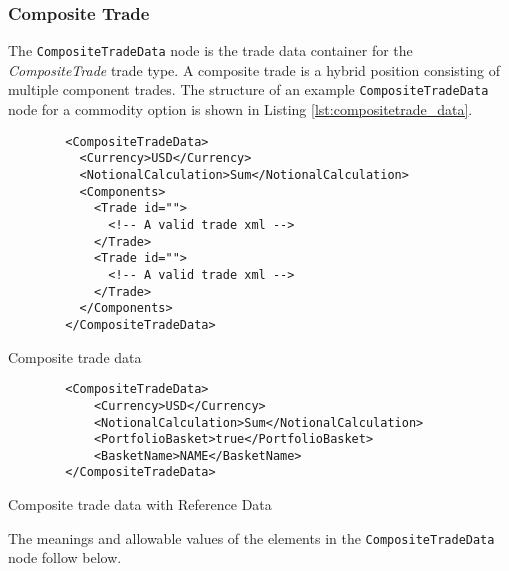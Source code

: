 \subsubsection{Composite Trade}

The \lstinline!CompositeTradeData!  node is the trade data container for the  \emph{CompositeTrade} trade type.   A composite trade is a hybrid position consisting of multiple component trades. The structure of an example \lstinline!CompositeTradeData! node for a commodity option is shown in 
Listing \ref{lst:compositetrade_data}.

\begin{listing}[H]
	\begin{verbatim}
		<CompositeTradeData>
		  <Currency>USD</Currency>
		  <NotionalCalculation>Sum</NotionalCalculation>
		  <Components>
		    <Trade id="">
		      <!-- A valid trade xml -->
		    </Trade>
		    <Trade id="">
		      <!-- A valid trade xml -->
		    </Trade>
		  </Components>
		</CompositeTradeData>
	\end{verbatim}
	\caption{Composite trade data}
	\label{lst:compositetrade_data}
	\begin{verbatim}
		<CompositeTradeData>
			<Currency>USD</Currency>
			<NotionalCalculation>Sum</NotionalCalculation>
			<PortfolioBasket>true</PortfolioBasket>
			<BasketName>NAME</BasketName>
		</CompositeTradeData>
	\end{verbatim}
	\caption{Composite trade data with Reference Data}
	\label{lst:compositetrade_data_refdata}
\end{listing}

The meanings and allowable values of the elements in the \lstinline!CompositeTradeData!  node follow below.

